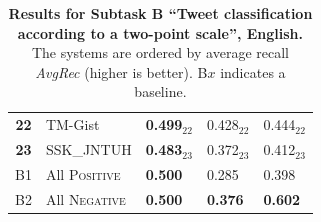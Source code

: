 \begin{table}[h!]
\begin{small}
\begin{tabular}{|c|l|l|l|l|}
\bf 22 & TM-Gist & \bf 0.499$_{22}$ & 0.428$_{22}$ & 0.444$_{22}$ \\
\bf 23 & SSK\_JNTUH & \bf 0.483$_{23}$ & 0.372$_{23}$ & 0.412$_{23}$ \\
\hline
B1 & All \textsc{Positive} & \bf 0.500 & 0.285 & 0.398\\
B2 & All \textsc{Negative} & \bf 0.500 & \bf 0.376 & \bf 0.602\\
\hline
\end{tabular}
\caption{\textbf{Results for Subtask B ``Tweet classification according to a two-point scale'', English.} The systems are ordered by average recall \emph{AvgRec} (higher is better). B$x$ indicates a baseline.}
\label{table:ResultsSubtaskB:English}
\end{small}
\end{table}
